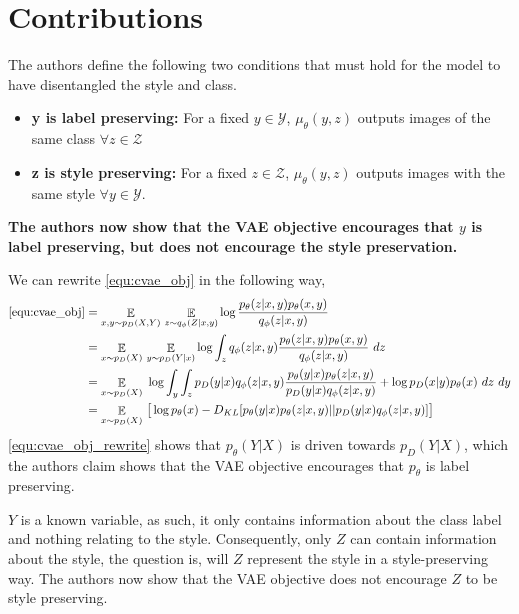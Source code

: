 \documentclass[11pt, a4paper]{article}
\DeclareMathOperator{\EX}{\mathbb{E}}%
\begin{document}
\section{Contributions}
The authors define the following two conditions that must hold for the model to have disentangled the style and class.
\begin{itemize}
	\item \textbf{y is label preserving:} For a fixed $y \in \mathcal{Y}$, $\mu_\theta(y,z)$ outputs images of the same class $\forall z \in \mathcal{Z}$
	\item \textbf{z is style preserving:} For a fixed $z \in \mathcal{Z}$, $\mu_\theta(y,z)$ outputs images with the same style $\forall y \in \mathcal{Y}$.
\end{itemize}

\textbf{The authors now show that the VAE objective encourages that $y$ is label preserving, but does not encourage the style preservation.}


We can rewrite \eqref{equ:cvae_obj} in the following way,
\begin{align}
\eqref{equ:cvae_obj} &= \underset{x, y \sim p_D(X,Y)}{\EX}\ \underset{z \sim q_\phi(Z|x,y)}{\EX} \log \frac{p_\theta(z|x,y) p_\theta(x,y)}{q_\phi(z|x,y)} \\
&= \underset{x\sim p_D(X)}{\EX}\ \underset{y \sim p_D(Y|x)}{\EX} \log \int_z q_\phi(z|x,y) \frac{p_\theta(z|x,y) p_\theta(x,y)}{q_\phi(z|x,y)}\ dz\\
&= \underset{x\sim p_D(X)}{\EX}\ \log \int_y \int_z p_D(y|x) q_\phi(z|x,y) \frac{p_\theta(y|x) p_\theta(z|x,y)}{p_D(y|x) q_\phi(z|x,y)} + \log p_D(x|y) p_\theta(x) \ dz\ dy\\
&= \underset{x\sim p_D(X)}{\EX}\ \big[ \log p_\theta(x) - D_{KL}[p_\theta(y|x) p_\theta(z|x,y)||p_D(y|x) q_\phi(z|x,y)] \big]
\label{equ:cvae_obj_rewrite}
\end{align}
\eqref{equ:cvae_obj_rewrite} shows that $p_\theta(Y|X)$ is driven towards $p_D(Y|X)$, which the authors claim shows that the VAE objective encourages that $p_\theta$ is label preserving.

$Y$ is a known variable, as such, it only contains information about the class label and nothing relating to the style. Consequently, only $Z$ can contain information about the style, the question is, will $Z$ represent the style in a style-preserving way. The authors now show that the VAE objective does not encourage $Z$ to be style preserving.
\end{document}
